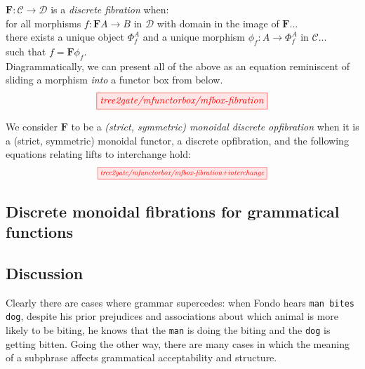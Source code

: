\begin{fullwidth}
\begin{defn}
$\mathbf{F}: \mathcal{C} \rightarrow \mathcal{D}$ is a \emph{discrete fibration} when:\\
for all morphisms $f: \mathbf{F}A \rightarrow B$ in $\mathcal{D}$ with domain in the image of $\mathbf{F}$...\\
there exists a unique object $\Phi^A_f$ and a unique morphism $\phi_f: A \rightarrow \Phi^A_f$ in $\mathcal{C}$...\\
such that $f = \mathbf{F}\phi_f$.\\

Diagrammatically, we can present all of the above as an equation reminiscent of sliding a morphism \emph{into} a functor box from below.
\[\tikzfig{tree2gate/mfunctorbox/mfbox-fibration}\]
\end{defn}

\begin{defn}
We consider $\mathbf{F}$ to be a \emph{(strict, symmetric) monoidal discrete opfibration} when it is a (strict, symmetric) monoidal functor, a discrete opfibration, and the following equations relating lifts to interchange hold:
\[\scalebox{0.75}{\tikzfig{tree2gate/mfunctorbox/mfbox-fibration+interchange}}\]
\end{defn}

\subsection{Discrete monoidal fibrations for grammatical functions}

\subsection{Discussion}

 Clearly there are cases where grammar supercedes: when Fondo hears \texttt{man bites dog}, despite his prior prejudices and associations about which animal is more likely to be biting, he knows that the \texttt{man} is doing the biting and the \texttt{dog} is getting bitten. Going the other way, there are many cases in which the meaning of a subphrase affects grammatical acceptability and structure.


\end{fullwidth}
